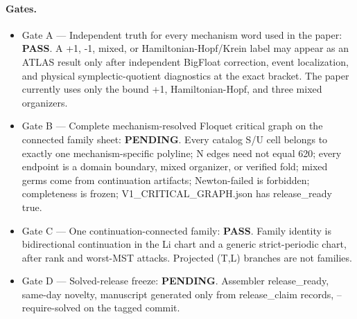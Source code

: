 \paragraph{Gates.}
\begin{itemize}
\item Gate A --- Independent truth for every mechanism word used in the paper: \textbf{PASS}. A +1, -1, mixed, or Hamiltonian-Hopf/Krein label may appear as an ATLAS result only after independent BigFloat correction, event localization, and physical symplectic-quotient diagnostics at the exact bracket. The paper currently uses only the bound +1, Hamiltonian-Hopf, and three mixed organizers.
\item Gate B --- Complete mechanism-resolved Floquet critical graph on the connected family sheet: \textbf{PENDING}. Every catalog S/U cell belongs to exactly one mechanism-specific polyline; N edges need not equal 620; every endpoint is a domain boundary, mixed organizer, or verified fold; mixed germs come from continuation artifacts; Newton-failed is forbidden; completeness is frozen; V1\_CRITICAL\_GRAPH.json has release\_ready true.
\item Gate C --- One continuation-connected family: \textbf{PASS}. Family identity is bidirectional continuation in the Li chart and a generic strict-periodic chart, after rank and worst-MST attacks. Projected (T,L) branches are not families.
\item Gate D --- Solved-release freeze: \textbf{PENDING}. Assembler release\_ready, same-day novelty, manuscript generated only from release\_claim records, --require-solved on the tagged commit.
\end{itemize}
